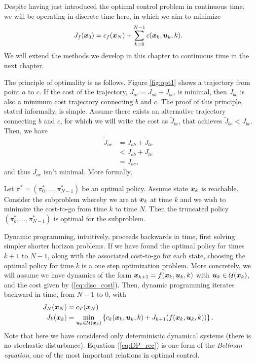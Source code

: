 Despite having just introduced the optimal control problem in continuous time, we will be operating in discrete time here, in which we aim to minimize 
\begin{equation}
    J_f(\bm{x}_0) = c_f(\bm{x}_N) + \sum_{k=0}^{N-1} c(\bm{x}_k, \bm{u}_k, k).
    \label{eq:disc_cost}
\end{equation}
We will extend the methods we develop in this chapter to continuous time in the next chapter. 

The principle of optimality is as follows. Figure \ref{fig:opt1} shows a trajectory from point $a$ to $c$. If the cost of the trajectory, $J_{ac} = J_{ab} + J_{bc}$, is minimal, then $J_{bc}$ is also a minimum cost trajectory connecting $b$ and $c$. The proof of this principle, stated informally, is simple. Assume there exists an alternative trajectory connecting $b$ and $c$, for which we will write the cost as $\tilde{J}_{bc}$, that achieves $\tilde{J}_{bc} < J_{bc}$. Then, we have 
\begin{align}
    \tilde{J}_{ac} &= J_{ab} + \tilde{J}_{bc}\\
    &< J_{ab} + J_{bc}\\
    &= J_{ac},
\end{align}
and thus $J_{ac}$ isn't minimal. More formally,

\begin{theorem}
Let $\pi^* = (\pi_0^*, \ldots, \pi^*_{N-1})$ be an optimal policy. Assume state $\bm{x}_k$ is reachable. Consider the subproblem whereby we are at $\bm{x}_k$ at time $k$ and we wish to minimize the cost-to-go from time $k$ to time $N$. Then the truncated policy $(\pi_k^*, \ldots, \pi^*_{N-1})$ is optimal for the subproblem.
\end{theorem}

Dynamic programming, intuitively, proceeds backwards in time, first solving simpler shorter horizon problems. If we have found the optimal policy for times $k+1$ to $N-1$, along with the associated cost-to-go for each state, choosing the optimal policy for time $k$ is a one step optimization problem. More concretely, we will assume we have dynamics of the form $\bm{x}_{k+1} = f(\bm{x}_k,\bm{u}_k,k)$ with $\bm{u}_k \in \mathcal{U}(\bm{x}_k)$, and the cost given by (\ref{eq:disc_cost}). Then, dynamic programming iterates backward in time, from $N-1$ to $0$, with
\begin{align}
    J_N(\bm{x}_N) &= c_T(\bm{x}_N)\\
    J_k(\bm{x}_k) &= \min_{\bm{u}_k \in \mathcal{U}(\bm{x}_k)} \left\{ c_k(\bm{x}_k,\bm{u}_k,k) + J_{k+1}(f(\bm{x}_k,\bm{u}_k,k)) \right\}.
    \label{eq:DP_rec}
\end{align}
Note that here we have considered only deterministic dynamical systems (there is no stochastic disturbance). Equation (\ref{eq:DP_rec}) is one form of the \textit{Bellman equation}, one of the most important relations in optimal control. 

